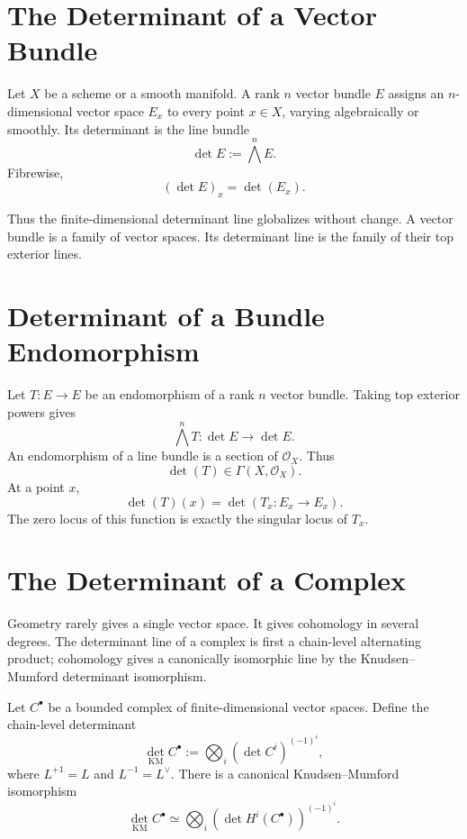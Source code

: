 \documentclass[11pt]{memoir}
\providecommand{\cO}{\mathcal{O}}
\begin{document}
\section{The Determinant of a Vector Bundle}
\label{sec:vector-bundle-det}

Let \(X\) be a scheme or a smooth manifold. A rank \(n\) vector bundle
\(E\) assigns an \(n\)-dimensional vector space \(E_x\) to every point
\(x\in X\), varying algebraically or smoothly. Its determinant is the
line bundle
\[
  \det E:=\bigwedge^n E.
\]
Fibrewise,
\[
  (\det E)_x=\det(E_x).
\]

Thus the finite-dimensional determinant line globalizes without
change. A vector bundle is a family of vector spaces. Its determinant
line is the family of their top exterior lines.

\section{Determinant of a Bundle Endomorphism}
\label{sec:bundle-endomorphism}

Let \(T:E\to E\) be an endomorphism of a rank \(n\) vector bundle.
Taking top exterior powers gives
\[
  \bigwedge^nT:\det E\to\det E.
\]
An endomorphism of a line bundle is a section of \(\cO_X\). Thus
\[
  \det(T)\in \Gamma(X,\cO_X).
\]
At a point \(x\),
\[
  \det(T)(x)=\det(T_x:E_x\to E_x).
\]
The zero locus of this function is exactly the singular locus of
\(T_x\).

\section{The Determinant of a Complex}
\label{sec:det-complex}

Geometry rarely gives a single vector space. It gives cohomology in
several degrees. The determinant line of a complex is first a
chain-level alternating product; cohomology gives a canonically
isomorphic line by the Knudsen--Mumford determinant isomorphism.

\begin{definition}
\label{def:det-complex}
Let \(C^\bullet\) be a bounded complex of finite-dimensional vector
spaces. Define the chain-level determinant
\[
  \det_{\mathrm{KM}} C^\bullet
  :=
  \bigotimes_i \left(\det C^i\right)^{(-1)^i},
\]
where \(L^{+1}=L\) and \(L^{-1}=L^\vee\).
There is a canonical Knudsen--Mumford isomorphism
\[
  \det_{\mathrm{KM}} C^\bullet
  \simeq
  \bigotimes_i \left(\det H^i(C^\bullet)\right)^{(-1)^i}.
\]
\end{definition}
\end{document}

